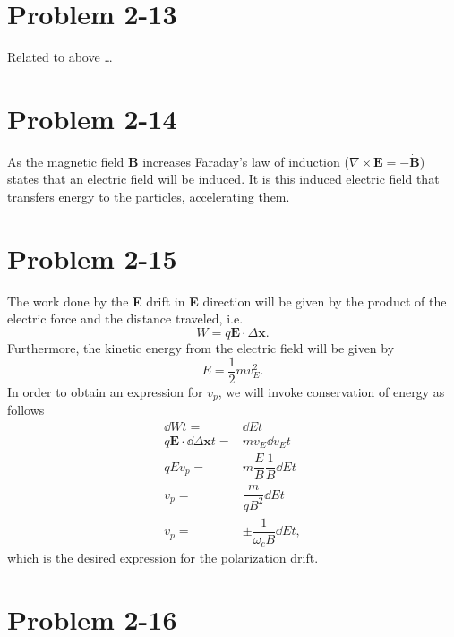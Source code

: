 \section*{Problem 2-13}
\label{sec:2-13}
Related to above \dots

\section*{Problem 2-14}
\label{sec:2-14}
As the magnetic field \textbf{B} increases Faraday's law of induction (\(\nabla \times \textbf{E} = -\dot{\textbf{B}} \)) states that an electric field will be induced. It is this induced electric field that transfers energy to the particles, accelerating them. 

\section*{Problem 2-15}
\label{sec:2-15}
The work done by the \textbf{E} drift in \textbf{E} direction will be given by the product of the electric force and the distance traveled, i.e.
\begin{equation}
	W = q\textbf{E}\cdot\Delta\textbf{x}.
\end{equation}
Furthermore, the kinetic energy from the electric field will be given by
\begin{equation}
	E = \dfrac{1}{2}mv_E^2.
\end{equation}
In order to obtain an expression for \(v_p\), we will invoke conservation of energy as follows
\begin{align}
	\dd{W}{t} =& \dd{E}{t}\\
	q\textbf{E}\cdot\dd{\Delta\textbf{x}}{t} =& mv_E\dd{v_E}{t} \\
	qEv_p =& m\dfrac{E}{B}\dfrac{1}{B}\dd{E}{t} \\
	v_p =& \dfrac{m}{qB^2}\dd{E}{t} \\
	v_p =& \pm\dfrac{1}{\omega_cB}\dd{E}{t},
\end{align}
which is the desired expression for the polarization drift.

\section*{Problem 2-16}
\label{sec:2-16}



